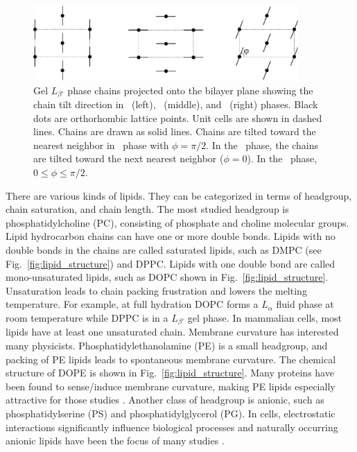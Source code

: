 \begin{figure}[htbp]
  \centering
  \includegraphics[width=0.9\textwidth]{figures/gel_phase_packing}
  \caption[Gel $L_{\beta'}$ phase chains projected onto the bilayer plane showing 
  the chain tilt direction in \LbetaI\ (left), \LbetaF\ (middle), and
  \LbetaL\ (right) phases]
  {Gel $L_{\beta'}$ phase chains projected onto the bilayer plane showing 
  the chain tilt direction in \LbetaI\ (left), \LbetaF\ (middle), and
  \LbetaL\ (right) phases. Black dots are orthorhombic lattice points.
  Unit cells are shown in dashed lines.
  Chains are drawn as solid lines. Chains are tilted toward the
  nearest neighbor in \LbetaI\ phase with $\phi=\pi/2$. 
  In the \LbetaF\ phase, the chains are tilted toward the next nearest neighbor
  ($\phi=0$). In the \LbetaL\ phase, $0 \leq \phi \leq \pi/2$.}
  \label{fig:gel_phase_packing}
\end{figure}

There are various kinds of lipids. They can be 
categorized in terms of headgroup, chain saturation, and chain length.
The most studied headgroup is phosphatidylcholine (PC),
consisting of phosphate and choline molecular groups. 
Lipid hydrocarbon chains can have one or more double bonds. 
Lipids
with no double bonds in the chains are called saturated lipids,
such as DMPC (see Fig.~\ref{fig:lipid_structure}) and DPPC. 
Lipids with one double bond
are called mono-unsaturated lipids, such as DOPC shown in Fig.~\ref{fig:lipid_structure}.
Unsaturation leads to chain packing frustration and lowers the melting 
temperature. 
For example, at full hydration DOPC forms a $L_{\alpha}$ fluid phase at room temperature
while DPPC is in a $L_{\beta'}$ gel phase.
In mammalian cells, most lipids have at least one unsaturated chain.
Membrane curvature has interested many physicists. 
Phosphatidylethanolamine (PE) is a small 
headgroup, and packing of PE lipids leads to spontaneous membrane curvature.
The chemical structure of DOPE is shown in Fig.~\ref{fig:lipid_structure}.
Many proteins have been found to sense/induce membrane curvature, 
making PE lipids especially attractive for those studies \cite{ref:Chernomordik03}.
Another class of headgroup is
anionic, such as phosphatidylserine (PS) and phosphatidylglycerol (PG). 
In cells, electrostatic interactions
significantly influence biological processes and naturally occurring anionic
lipids have been the focus of many studies \cite{ref:Dowhan97}.

